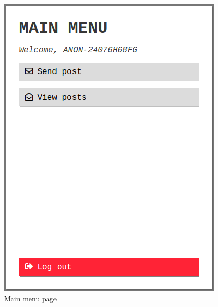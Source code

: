\begin{table}[H]
\begin{minipage}{.33\textwidth}
\begin{figure}[H]
            \includegraphics[width=0.95\linewidth]{InteraktionsDesign/Assets/Prototype/3.png}
            \caption{Main menu page}
            \label{fig:prototype3}
        \end{figure}
    \end{minipage}
    \begin{minipage}{.33\textwidth}
        \begin{figure}[H]
            \centering

\end{figure}
\end{minipage}
\end{table}
